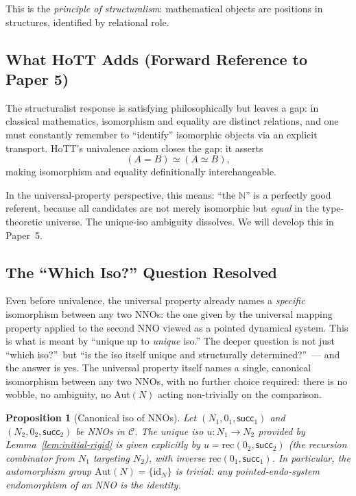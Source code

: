 \documentclass[12pt]{article}
\newtheorem{proposition}[theorem]{Proposition}
\theoremstyle{definition}
\theoremstyle{remark}
\newcommand{\N}{\mathbb{N}}
\newcommand{\id}{\mathrm{id}}
\newcommand{\suc}{\mathsf{succ}}
\begin{document}
This is the \emph{principle of structuralism}: mathematical objects are positions in structures, identified by relational role.

\subsection{What HoTT Adds (Forward Reference to Paper 5)}

The structuralist response is satisfying philosophically but leaves a gap: in classical mathematics, isomorphism and equality are distinct relations, and one must constantly remember to ``identify'' isomorphic objects via an explicit transport. HoTT's univalence axiom \cite{HoTTBook2013,Voevodsky2015} closes the gap: it asserts
\begin{equation}
(A = B) \simeq (A \simeq B),
\label{eq:univalence}
\end{equation}
making isomorphism and equality definitionally interchangeable.

In the universal-property perspective, this means: ``the $\N$'' is a perfectly good referent, because all candidates are not merely isomorphic but \emph{equal} in the type-theoretic universe. The unique-iso ambiguity dissolves. We will develop this in Paper~5.

\subsection{The ``Which Iso?'' Question Resolved}

Even before univalence, the universal property already names a \emph{specific} isomorphism between any two NNOs: the one given by the universal mapping property applied to the second NNO viewed as a pointed dynamical system. This is what is meant by ``unique up to \emph{unique} iso.'' The deeper question is not just ``which iso?''~but ``is the iso itself unique and structurally determined?''~--- and the answer is yes. The universal property itself names a single, canonical isomorphism between any two NNOs, with no further choice required: there is no wobble, no ambiguity, no Aut$(N)$ acting non-trivially on the comparison.

\begin{proposition}[Canonical iso of NNOs]
\label{prop:can-iso}
Let $(N_1, 0_1, \suc_1)$ and $(N_2, 0_2, \suc_2)$ be NNOs in $\mathcal{C}$. The unique iso $u \colon N_1 \to N_2$ provided by Lemma~\ref{lem:initial-rigid} is given explicitly by $u = \mathrm{rec}(0_2, \suc_2)$ (the recursion combinator from $N_1$ targeting $N_2$), with inverse $\mathrm{rec}(0_1, \suc_1)$. In particular, the automorphism group $\mathrm{Aut}(N) = \{\id_N\}$ is trivial: any pointed-endo-system endomorphism of an NNO is the identity.
\end{proposition}
\end{document}
